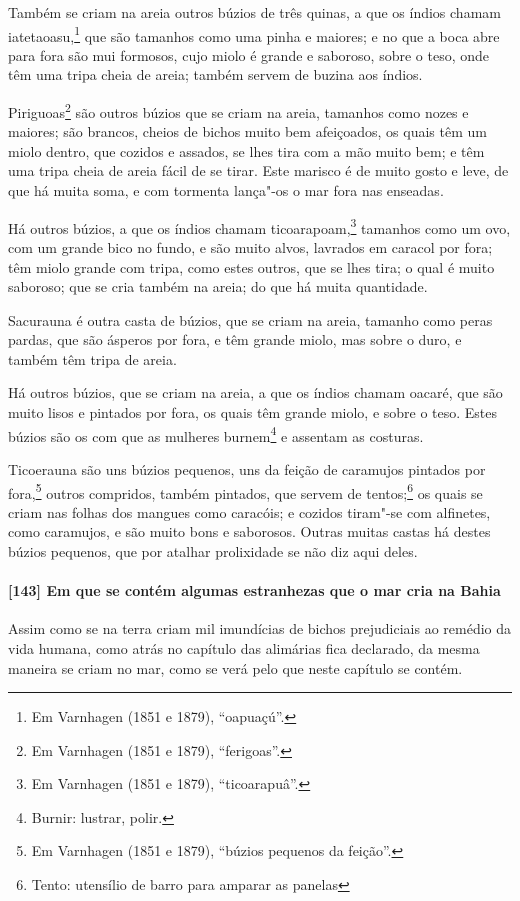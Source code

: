 \begin{linenumbers}
Também se criam na areia outros búzios de três quinas, a que os índios chamam
iatetaoasu,\footnote{ Em Varnhagen (1851 e 1879), ``oapuaçú''.} que são tamanhos como uma
pinha e maiores; e no que a boca abre para fora são mui formosos, cujo miolo é grande e
saboroso, sobre o teso, onde têm uma tripa cheia de areia; também servem de buzina aos
índios.

Piriguoas\footnote{ Em Varnhagen (1851 e 1879), ``ferigoas''.} são outros búzios que se
criam na areia, tamanhos como nozes e maiores; são brancos, cheios de bichos muito bem
afeiçoados, os quais têm um miolo dentro, que cozidos e assados, se lhes tira com a mão
muito bem; e têm uma tripa cheia de areia fácil de se tirar. Este marisco é de muito gosto
e leve, de que há muita soma, e com tormenta lança"-os o mar fora nas enseadas.

Há outros búzios, a que os índios chamam ticoarapoam,\footnote{ Em Varnhagen (1851 e 1879),
``ticoarapuâ''.} tamanhos como um ovo, com um grande bico no fundo, e são muito alvos,
lavrados em caracol por fora; têm miolo grande com tripa, como estes outros, que se lhes
tira; o qual é muito saboroso; que se cria também na areia; do que há muita quantidade.

Sacurauna é outra casta de búzios, que se criam na areia, tamanho como peras pardas, que
são ásperos por fora, e têm grande miolo, mas sobre o duro, e também têm tripa de areia.

Há outros búzios, que se criam na areia, a que os índios chamam oacaré, que são muito
lisos e pintados por fora, os quais têm grande miolo, e sobre o teso. Estes búzios são os
com que as mulheres burnem\footnote{ Burnir: lustrar, polir.} e assentam as costuras.

Ticoerauna são uns búzios pequenos, uns da feição de caramujos pintados por
fora,\footnote{ Em Varnhagen (1851 e 1879), ``búzios pequenos da feição''.} outros
compridos, também pintados, que servem de tentos;\footnote{ Tento: utensílio de barro para
amparar as panelas} os quais se criam nas folhas dos mangues como
caracóis; e cozidos tiram"-se com alfinetes, como caramujos, e são muito bons e saborosos.
Outras muitas castas há destes búzios pequenos, que por atalhar prolixidade se não diz
aqui deles.

\paragraph{[143] Em que se contém algumas estranhezas que o mar cria na Bahia}\quad
Assim como se na terra criam mil imundícias de bichos prejudiciais ao remédio da vida
humana, como atrás no capítulo das alimárias fica declarado, da mesma maneira se criam no
mar, como se verá pelo que neste capítulo se contém.


\end{linenumbers}
